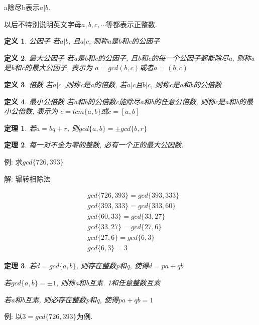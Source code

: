\documentclass[UTF8]{ctexart}
\newtheorem{theorem}{\hspace{2em}定理}[section]
\newtheorem{definition}{\hspace{2em}定义}[section]
\begin{document}
    a除尽b表示$a|b$.

    以后不特别说明英文字母$a, b, c,\cdots$等都表示正整数.
    \begin{definition}{公因子}
        若$a|b$, 且$a|c$, 则称a是b和c的公因子
    \end{definition}
    \begin{definition}{最大公因子}
        若a是b和c的公因子, 且b和c的每一个公因子都能除尽a, 则称a是b和c的最大公因子, 表示为
        $a=gcd(b,c)$或者$a=(b,c)$
    \end{definition}
    \begin{definition}{倍数}
        若$a|c$ ,则称c是a的倍数, 若$a|c$且$b|c$, 则称c是a和b的公倍数
    \end{definition}
    \begin{definition}{最小公倍数}
        若a和b的公倍数c能除尽a和b的任意公倍数, 则称c是a和b的最小公倍数, 表示为
        $c=lcm\{a,b\}$或$c=[a,b]$
    \end{definition}

    \begin{theorem}
        若$a=bq+r$, 则$gcd\{a, b\}=\pm gcd\{b, r\}$
    \end{theorem}
    \begin{theorem}
        每一对不全为零的整数, 必有一个正的最大公因数.
    \end{theorem}

    例: 求$gcd\{726, 393\}$

    解: 辗转相除法

    $$
    \begin{aligned}
        &gcd\{726, 393\}=gcd\{393, 333\}\\
        &gcd\{393, 333\}=gcd\{333, 60\}\\
        &gcd\{60, 33\}=gcd\{33, 27\}\\
        &gcd\{33, 27\}=gcd\{27, 6\}\\
        &gcd\{27, 6\}=gcd\{6, 3\}\\
        &gcd\{6, 3\}=3
    \end{aligned}
    $$

    \begin{theorem}
        若$d=gcd\{a, b\}$, 则存在整数p和q, 使得$d=pa+qb$

        若$gcd\{a,b\}=\pm 1$, 则称a和b互素. 1和任意整数互素

        若a和b互素, 则必存在整数p和q, 使得$pa+qb=1$
    \end{theorem}

    例: 以$3=gcd\{726, 393\}$为例.
\end{document}
